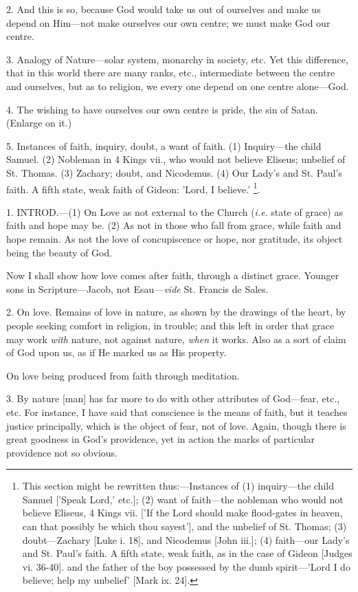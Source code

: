 2. And this is so, because God would take us out
of ourselves and make us depend on Him—not make ourselves our own
centre; we must make God our centre.

3. Analogy of Nature—solar system, monarchy in
society, etc. Yet this difference, that in this world there are many
ranks, etc., intermediate between the centre and ourselves, but
as to religion, we every one depend on one centre alone—God.

4. The wishing to have ourselves our own centre
is pride, the sin of Satan. (Enlarge on it.)

5. Instances of faith, inquiry, doubt, a want of
faith. (1) Inquiry—the child Samuel. (2) Nobleman in 4 Kings vii.,
who would not believe Eliseus; unbelief of St. Thomas. (3) Zachary;
doubt, and Nicodemus. (4) Our Lady's and St. Paul's faith. A fifth
state, weak faith of Gideon: 'Lord, I believe.' \footnote{This section might be
rewritten thus:—Instances of (1) inquiry—the child Samuel ['Speak
Lord,' etc.]; (2) want of faith—the nobleman who would not believe
Eliseus, 4 Kings vii. ['If the Lord should make flood-gates in heaven,
can that possibly be which thou sayest'], and the unbelief of St.
Thomas; (3) doubt—Zachary [Luke i. 18], and Nicodemus [John iii.];
(4) faith—our Lady's and St. Paul's faith. A fifth state, weak
faith, as in the case of Gideon [Judges vi. 36-40]. and the father of
the boy possessed by the dumb spirit—'Lord I do believe; help my
unbelief' [Mark ix. 24].}.


1. INTROD.—(1)
On Love as not external to the Church (\emph{i.e}. state of grace) as
faith and hope may be. (2) As not in those who fall from grace, while
faith and hope remain. As not the love of concupiscence or hope, nor
gratitude, its object being the beauty of God.

Now I shall show how love comes after faith,
through a distinct grace. Younger sons in Scripture—Jacob, not
Esau—\emph{vide} St. Francis de Sales.

2. On love. Remains of love in nature, as shown
by the drawings of the heart, by people seeking comfort in religion,
in trouble; and this left in order that grace may work \emph{with}
nature, not against nature, \emph{when} it works. Also as a sort of
claim of God upon us, as if He marked us as His property.

On love being produced from faith through
meditation.

3. By nature [man] has far more to do with other
attributes of God—fear, etc., etc. For instance, I have said that
conscience is the means of faith, but it teaches justice principally,
which is the object of fear, not of love. Again, though there is great
goodness in God's providence, yet in action the marks of particular
providence not so obvious.

